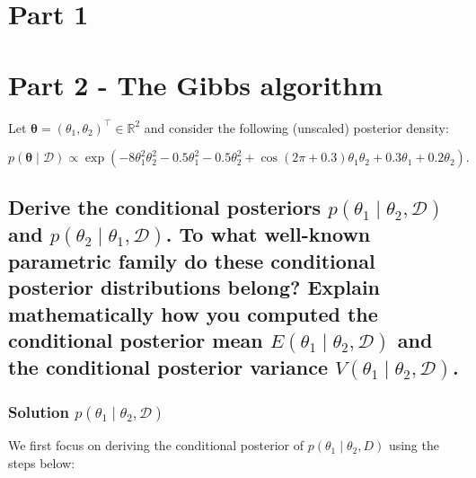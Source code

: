 \documentclass[12pt]{article}
\begin{document}
\section{Part 1}

\section{Part 2 - The Gibbs algorithm}
Let \(\boldsymbol{\theta} = (\theta_1, \theta_2)^\top \in \mathbb{R}^2\) and consider the following (unscaled) posterior density:

\[
p(\boldsymbol{\theta} \mid \mathcal{D}) \propto \exp\left(-8\theta_1^2\theta_2^2 - 0.5\theta_1^2 - 0.5\theta_2^2 + \cos(2\pi + 0.3)\theta_1\theta_2 + 0.3\theta_1 + 0.2\theta_2 \right).
\]

\subsection{Derive the conditional posteriors \(p(\theta_1 \mid \theta_2, \mathcal{D})\) and \(p(\theta_2 \mid \theta_1, \mathcal{D})\). To what well-known parametric family do these conditional posterior distributions belong? Explain mathematically how you computed the conditional posterior mean \(E(\theta_1 \mid \theta_2, \mathcal{D})\) and the conditional posterior variance \(V(\theta_1 \mid \theta_2, \mathcal{D})\).} 
\subsubsection{Solution \(p(\theta_1 \mid \theta_2, \mathcal{D})\) }{\label{theta1}}
We first focus on deriving the conditional posterior of  \(p(\theta_1 \mid \theta_2, D)\) using the steps below:
\end{document}
